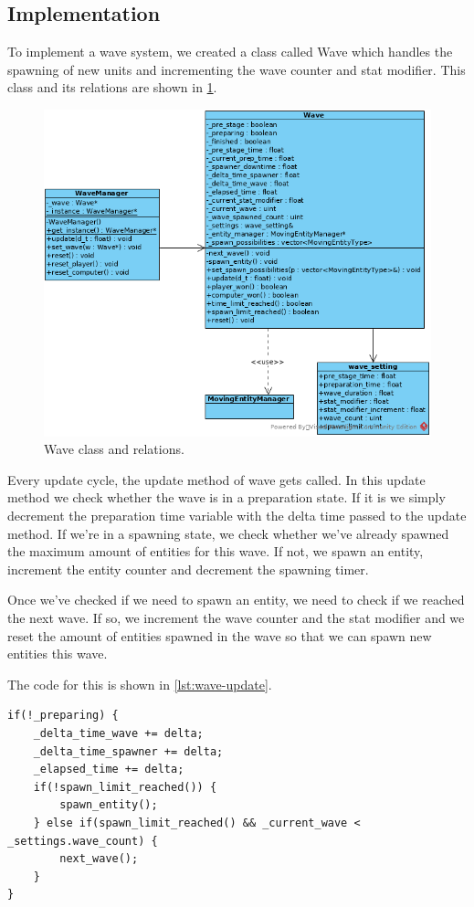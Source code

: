 \subsection{Implementation}
\label{sec:wave-implementation}

To implement a wave system, we created a class called Wave which handles the 
spawning of new units and incrementing the wave counter and stat modifier.
This class and its relations are shown in \cref{fig:wave}.

\begin{figure}[!htb]
    \centering
    \includegraphics[scale=0.75]{res/wave.png}
    \caption{Wave class and relations.}\label{fig:wave}
\end{figure}

Every update cycle, the update method of wave gets called. In this update 
method we check whether the wave is in a preparation state. If it is we 
simply decrement the preparation time variable with the delta time passed to 
the update method. If we're in a spawning state, we check whether we've 
already spawned the maximum amount of entities for this wave. If not, we spawn 
an entity, increment the entity counter and decrement the spawning timer.

Once we've checked if we need to spawn an entity, we need to check if we 
reached the next wave. If so, we increment the wave counter and the stat 
modifier and we reset the amount of entities spawned in the wave so that we 
can spawn new entities this wave.

The code for this is shown in \cref{lst:wave-update}.
\\
\begin{lstlisting}[caption={Spawning entities and next wave.},
label={lst:wave-update}]
if(!_preparing) {
    _delta_time_wave += delta;
    _delta_time_spawner += delta;
    _elapsed_time += delta;
    if(!spawn_limit_reached()) {
        spawn_entity();
    } else if(spawn_limit_reached() && _current_wave < _settings.wave_count) {
        next_wave();
    }
}
\end{lstlisting}
